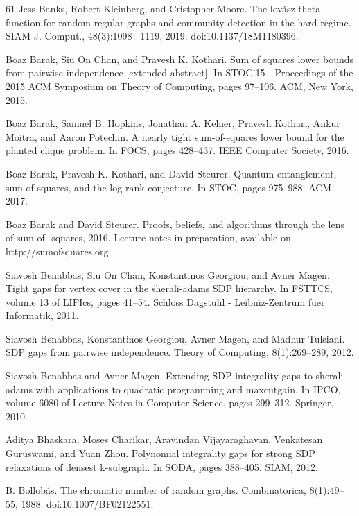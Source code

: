 \documentclass[10pt,a4paper]{article}
\theoremstyle{definition}
\begin{document}
\begin{thebibliography}{61}
Jess Banks, Robert Kleinberg, and Cristopher Moore. The lovász theta function for random regular graphs and community detection in the hard regime. SIAM J. Comput., 48(3):1098– 1119, 2019. doi:10.1137/18M1180396.

Boaz Barak, Siu On Chan, and Pravesh K. Kothari. Sum of squares lower bounds from pairwise independence [extended abstract]. In STOC’15—Proceedings of the 2015 ACM Symposium on Theory of Computing, pages 97–106. ACM, New York, 2015.

Boaz Barak, Samuel B. Hopkins, Jonathan A. Kelner, Pravesh Kothari, Ankur Moitra, and Aaron Potechin. A nearly tight sum-of-squares lower bound for the planted clique problem. In FOCS, pages 428–437. IEEE Computer Society, 2016.

Boaz Barak, Pravesh K. Kothari, and David Steurer. Quantum entanglement, sum of squares, and the log rank conjecture. In STOC, pages 975–988. ACM, 2017.

Boaz Barak and David Steurer. Proofs, beliefs, and algorithms through the lens of sum-of- squares, 2016. Lecture notes in preparation, available on http://sumofsquares.org.

Siavosh Benabbas, Siu On Chan, Konstantinos Georgiou, and Avner Magen. Tight gaps for vertex cover in the sherali-adams SDP hierarchy. In FSTTCS, volume 13 of LIPIcs, pages 41–54. Schloss Dagstuhl - Leibniz-Zentrum fuer Informatik, 2011.

Siavosh Benabbas, Konstantinos Georgiou, Avner Magen, and Madhur Tulsiani. SDP gaps from pairwise independence. Theory of Computing, 8(1):269–289, 2012.

Siavosh Benabbas and Avner Magen. Extending SDP integrality gaps to sherali-adams with applications to quadratic programming and maxcutgain. In IPCO, volume 6080 of Lecture Notes in Computer Science, pages 299–312. Springer, 2010.

Aditya Bhaskara, Moses Charikar, Aravindan Vijayaraghavan, Venkatesan Guruswami, and Yuan Zhou. Polynomial integrality gaps for strong SDP relaxations of densest k-subgraph. In SODA, pages 388–405. SIAM, 2012.

B. Bollobás. The chromatic number of random graphs. Combinatorica, 8(1):49–55, 1988. doi:10.1007/BF02122551.


\end{thebibliography}
\end{document}
